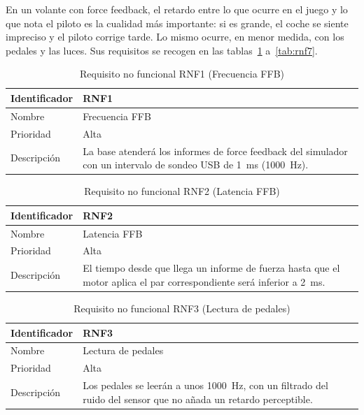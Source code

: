 En un volante con force feedback, el retardo entre lo que ocurre en el juego y lo que nota el piloto es la cualidad más importante: si es grande, el coche se siente impreciso y el piloto corrige tarde. Lo mismo ocurre, en menor medida, con los pedales y las luces. Sus requisitos se recogen en las tablas~\ref{tab:rnf1} a~\ref{tab:rnf7}.

\begin{table}[H]
	\centering
	\renewcommand{\arraystretch}{2}
	\begin{tabular}{|l|p{10cm}|}
		\hline
		Identificador & RNF1 \\
		\hline
		Nombre & Frecuencia FFB \\
		\hline
		Prioridad & Alta \\
		\hline
		Descripción & La base atenderá los informes de force feedback del simulador con un intervalo de sondeo USB de 1~ms (1000~Hz). \\
		\hline
	\end{tabular}
	\caption{Requisito no funcional RNF1 (Frecuencia FFB)}
	\label{tab:rnf1}
\end{table}

\begin{table}[H]
	\centering
	\renewcommand{\arraystretch}{2}
	\begin{tabular}{|l|p{10cm}|}
		\hline
		Identificador & RNF2 \\
		\hline
		Nombre & Latencia FFB \\
		\hline
		Prioridad & Alta \\
		\hline
		Descripción & El tiempo desde que llega un informe de fuerza hasta que el motor aplica el par correspondiente será inferior a 2~ms. \\
		\hline
	\end{tabular}
	\caption{Requisito no funcional RNF2 (Latencia FFB)}
	\label{tab:rnf2}
\end{table}

\begin{table}[H]
	\centering
	\renewcommand{\arraystretch}{2}
	\begin{tabular}{|l|p{10cm}|}
		\hline
		Identificador & RNF3 \\
		\hline
		Nombre & Lectura de pedales \\
		\hline
		Prioridad & Alta \\
		\hline
		Descripción & Los pedales se leerán a unos 1000~Hz, con un filtrado del ruido del sensor que no añada un retardo perceptible. \\
		\hline
	\end{tabular}
	\caption{Requisito no funcional RNF3 (Lectura de pedales)}
	\label{tab:rnf3}
\end{table}


